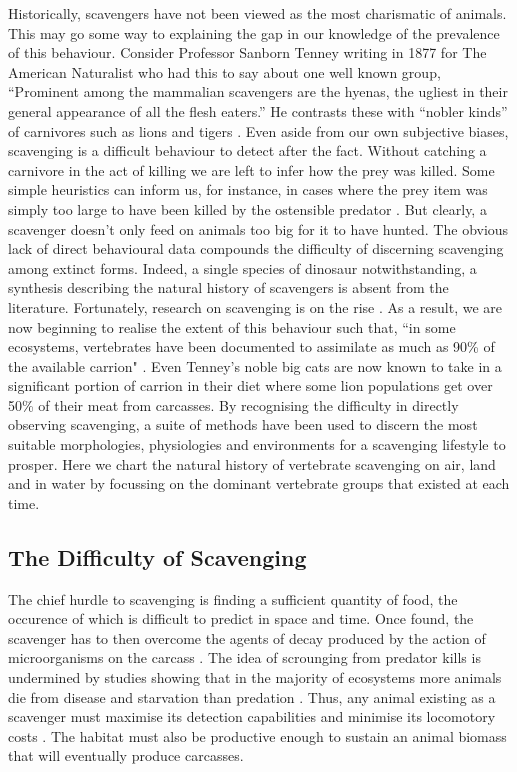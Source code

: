 \documentclass[a4paper,12pt]{article}
\begin{document}
Historically, scavengers have not been viewed as the most charismatic of animals. This may go some way to explaining the gap in our knowledge of the prevalence of this behaviour. Consider Professor Sanborn Tenney writing in 1877 for The American Naturalist who had this to say about one well known group, “Prominent among the mammalian scavengers are the hyenas, the ugliest in their general appearance of all the flesh eaters.” He contrasts these with “nobler kinds” of carnivores such as lions and tigers \citep{tenney1877few}. Even aside from our own subjective biases, scavenging is a difficult behaviour to detect after the fact. Without catching a carnivore in the act of killing we are left to infer how the prey was killed. Some simple heuristics can inform us, for instance, in cases where the prey item was simply too large to have been killed by the ostensible predator \citep{pobiner2008paleoecological}. But clearly, a scavenger doesn’t only feed on animals too big for it to have hunted. The obvious lack of direct behavioural data compounds the difficulty of discerning scavenging among extinct forms. Indeed, a single species of dinosaur notwithstanding, a synthesis describing the natural history of scavengers is absent from the literature. Fortunately, research on scavenging is on the rise \citep{manga2006vulture}. As a result, we are now beginning to realise the extent of this behaviour such that, “in some ecosystems, vertebrates have been documented to assimilate as much as 90\% of the available carrion" \citep{beasley2015vertebrates}. Even Tenney’s noble big cats are now known to take in a significant portion of carrion in their diet where some lion populations get over 50\% of their meat from carcasses. By recognising the difficulty in directly observing scavenging, a suite of methods have been used to discern the most suitable morphologies, physiologies and environments for a scavenging lifestyle to prosper. Here we chart the natural history of vertebrate scavenging on air, land and in water by focussing on the dominant vertebrate groups that existed at each time. %
\subsection*{The Difficulty of Scavenging}
The chief hurdle to scavenging is finding a sufficient quantity of food, the occurence of which is difficult to predict in space and time. Once found, the scavenger has to then overcome the agents of decay produced by the action of microorganisms on the carcass \citep{ruxton2014fruit}. The idea of scrounging from predator kills is undermined by studies showing that in the  majority of ecosystems more animals die from disease and starvation than predation \citep{benbow2015introduction}. Thus, any animal existing as a scavenger must maximise its detection capabilities and minimise its locomotory costs \citep{ruxton2004obligate}. The habitat must also be productive enough to sustain an animal biomass that will eventually produce carcasses. 
\end{document}
